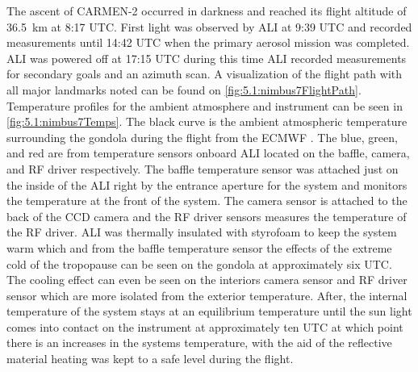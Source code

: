 The ascent of CARMEN-2 occurred in darkness and reached its flight altitude of 36.5~km at 8:17 UTC. First light was observed by ALI at 9:39 UTC and recorded measurements until 14:42 UTC when the primary aerosol mission was completed. ALI was powered off at 17:15 UTC during this time ALI recorded measurements for secondary goals and an azimuth scan. A visualization of the flight path with all major landmarks noted can be found on \autoref{fig:5.1:nimbus7FlightPath}. Temperature profiles for the ambient atmosphere and instrument can be seen in \autoref{fig:5.1:nimbus7Temps}. The black curve is the ambient atmospheric temperature surrounding the gondola during the flight from the ECMWF \citep{Molteni1996}. The blue, green, and red are from temperature sensors onboard ALI located on the baffle, camera, and RF driver respectively. The baffle temperature sensor was attached just on the inside of the ALI right by the entrance aperture for the system and monitors the temperature at the front of the system. The camera sensor is attached to the back of the CCD camera and the RF driver sensors measures the temperature of the RF driver. ALI was thermally insulated with styrofoam to keep the system warm which and from the baffle temperature sensor the effects of the extreme cold of the tropopause can be seen on the gondola at approximately six UTC. The cooling effect can even be seen on the interiors camera sensor and RF driver sensor which are more isolated from the exterior temperature. After, the internal temperature of the system stays at an equilibrium temperature until the sun light comes into contact on the instrument at approximately ten UTC at which point there is an increases in the systems temperature, with the aid of the reflective material heating was kept to a safe level during the flight.

